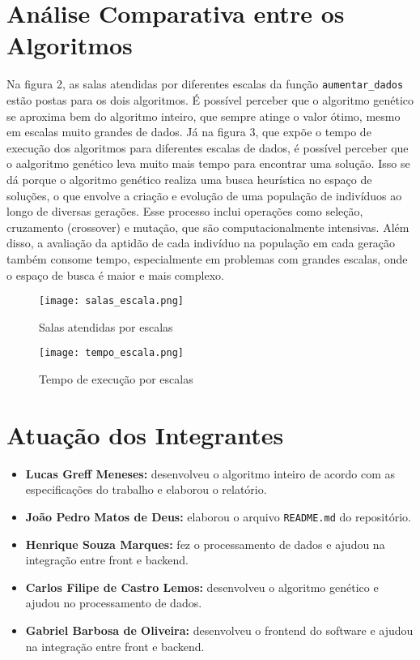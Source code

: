 \documentclass[a4paper,12pt]{article}
\begin{document}
\section{Análise Comparativa entre os Algoritmos}

Na figura 2, as salas atendidas por diferentes escalas da função \texttt{aumentar\_dados} estão postas para os dois algoritmos. É possível perceber que o algoritmo genético se aproxima bem do algoritmo inteiro, que sempre atinge o valor ótimo, mesmo em escalas muito grandes de dados. Já na figura 3, que expõe o tempo de execução dos algoritmos para diferentes escalas de dados, é possível perceber que o aalgoritmo genético leva muito mais tempo para encontrar uma solução. Isso se dá porque o algoritmo genético realiza uma busca heurística no espaço de soluções, o que envolve a criação e evolução de uma população de indivíduos ao longo de diversas gerações. Esse processo inclui operações como seleção, cruzamento (crossover) e mutação, que são computacionalmente intensivas. Além disso, a avaliação da aptidão de cada indivíduo na população em cada geração também consome tempo, especialmente em problemas com grandes escalas, onde o espaço de busca é maior e mais complexo.

\begin{figure}[H]
    \centering
    \texttt{[image: salas\_escala.png]}
    \caption{Salas atendidas por escalas}
    \label{fig:salas_escala}
\end{figure}

\begin{figure}[H]
    \centering
    \texttt{[image: tempo\_escala.png]}
    \caption{Tempo de execução por escalas}
    \label{fig:tempo_escala}
\end{figure}

\section{Atuação dos Integrantes}

\begin{itemize}
    \item \textbf{Lucas Greff Meneses:} desenvolveu o algoritmo inteiro de acordo com as especificações do trabalho e elaborou o relatório.

    \item \textbf{João Pedro Matos de Deus:} elaborou o arquivo \texttt{README.md} do repositório.

    \item \textbf{Henrique Souza Marques:} fez o processamento de dados e ajudou na integração entre front e backend.

    \item \textbf{Carlos Filipe de Castro Lemos:} desenvolveu o algoritmo genético e ajudou no processamento de dados.

    \item \textbf{Gabriel Barbosa de Oliveira:} desenvolveu o frontend do software e ajudou na integração entre front e backend.
\end{itemize}
\end{document}
